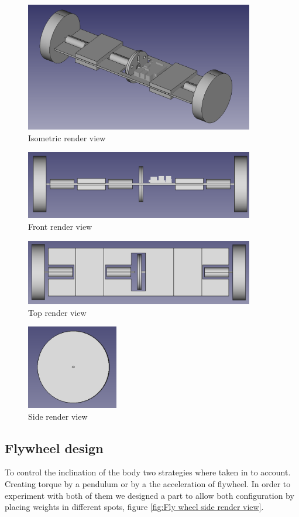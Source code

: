 \begin{figure}
	\centering
	\includegraphics[width=10cm]{img/isometric_view.png}
	\caption{Isometric render view}
	\label{fig:Isometric render view}
\end{figure}
\begin{figure}
	\centering
	\includegraphics[width=10cm]{img/front_view.png}
	\caption{Front render view}
	\label{fig:Front render view}
\end{figure}
\begin{figure}
	\centering
	\includegraphics[width=10cm]{img/top_view.png}
	\caption{Top render view}
	\label{fig:Top render view}
\end{figure}
\begin{figure}
	\centering
	\includegraphics[width=4cm]{img/side_view.png}
	\caption{Side render view}
	\label{fig:Side render view}
\end{figure}

\subsection{Flywheel design}
To control the inclination of the body two strategies where taken in to account. Creating torque by a pendulum or by a the acceleration of flywheel. In order to experiment with both of them we designed a part to allow both configuration by placing weights in different spots, figure \ref{fig:Fly wheel side render view}.

